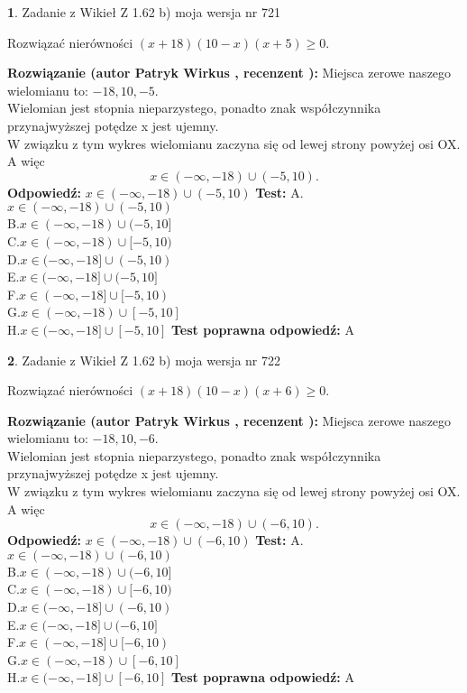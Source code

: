 \documentclass[12pt, a4paper]{article}
\theoremstyle{definition} %
\newtheorem{zad}{}
\newcommand{\zadStart}[1]{\begin{zad}#1\newline}
\newcommand{\zadStop}{\end{zad}}
\newcommand{\rozwStart}[2]{\noindent \textbf{Rozwiązanie (autor #1 , recenzent #2): }\newline}
\newcommand{\rozwStop}{\newline}
\newcommand{\odpStart}{\noindent \textbf{Odpowiedź:}\newline}
\newcommand{\odpStop}{\newline}
\newcommand{\testStart}{\noindent \textbf{Test:}\newline}
\newcommand{\testStop}{\newline}
\newcommand{\kluczStart}{\noindent \textbf{Test poprawna odpowiedź:}\newline}
\newcommand{\kluczStop}{\newline}
\begin{document}
\zadStart{Zadanie z Wikieł Z 1.62 b) moja wersja nr 721}

Rozwiązać nierówności $(x+18)(10-x)(x+5)\ge0$.
\zadStop
\rozwStart{Patryk Wirkus}{}
Miejsca zerowe naszego wielomianu to: $-18, 10, -5$.\\
Wielomian jest stopnia nieparzystego, ponadto znak współczynnika przy\linebreak najwyższej potędze x jest ujemny.\\ W związku z tym wykres wielomianu zaczyna się od lewej strony powyżej osi OX. A więc $$x \in (-\infty,-18) \cup (-5,10).$$
\rozwStop
\odpStart
$x \in (-\infty,-18) \cup (-5,10)$
\odpStop
\testStart
A.$x \in (-\infty,-18) \cup (-5,10)$\\
B.$x \in (-\infty,-18) \cup (-5,10]$\\
C.$x \in (-\infty,-18) \cup [-5,10)$\\
D.$x \in (-\infty,-18] \cup (-5,10)$\\
E.$x \in (-\infty,-18] \cup (-5,10]$\\
F.$x \in (-\infty,-18] \cup [-5,10)$\\
G.$x \in (-\infty,-18) \cup [-5,10]$\\
H.$x \in (-\infty,-18] \cup [-5,10]$
\testStop
\kluczStart
A
\kluczStop



\zadStart{Zadanie z Wikieł Z 1.62 b) moja wersja nr 722}

Rozwiązać nierówności $(x+18)(10-x)(x+6)\ge0$.
\zadStop
\rozwStart{Patryk Wirkus}{}
Miejsca zerowe naszego wielomianu to: $-18, 10, -6$.\\
Wielomian jest stopnia nieparzystego, ponadto znak współczynnika przy\linebreak najwyższej potędze x jest ujemny.\\ W związku z tym wykres wielomianu zaczyna się od lewej strony powyżej osi OX. A więc $$x \in (-\infty,-18) \cup (-6,10).$$
\rozwStop
\odpStart
$x \in (-\infty,-18) \cup (-6,10)$
\odpStop
\testStart
A.$x \in (-\infty,-18) \cup (-6,10)$\\
B.$x \in (-\infty,-18) \cup (-6,10]$\\
C.$x \in (-\infty,-18) \cup [-6,10)$\\
D.$x \in (-\infty,-18] \cup (-6,10)$\\
E.$x \in (-\infty,-18] \cup (-6,10]$\\
F.$x \in (-\infty,-18] \cup [-6,10)$\\
G.$x \in (-\infty,-18) \cup [-6,10]$\\
H.$x \in (-\infty,-18] \cup [-6,10]$
\testStop
\kluczStart
A
\kluczStop
\end{document}
